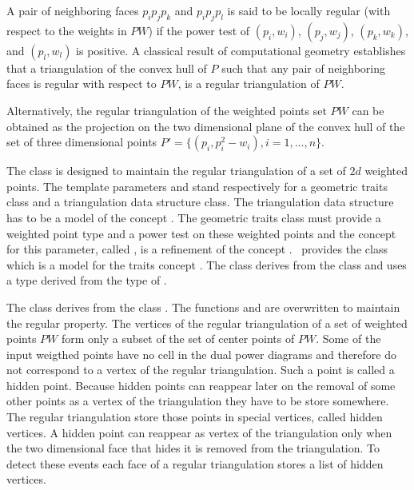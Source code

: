 A pair of neighboring faces $p_ip_jp_k$
and $p_ip_jp_l$ is said to be locally regular
(with respect to  the weights in ${  PW}$)
if the power test of $(p_i, w_i)$, $(p_j, w_j)$, $(p_k, w_k)$,
and $(p_l, w_l)$ is positive.
A classical  result of computational geometry
establishes that a triangulation of the convex hull of ${  P}$
such that any pair of neighboring faces is regular with respect
to ${  PW}$, is a
 regular triangulation of ${  PW}$.

Alternatively, the regular triangulation
of the weighted points set ${  PW}$
can be obtained as the projection
on the two dimensional plane of the convex hull of the set of three
dimensional points 
${  P'}= \{ (p_i,p_i ^2 - w_i ), i = 1, \ldots , n \}$.

The class 
 is designed to maintain the
regular triangulation of a set of $2d$ weighted points.
The template parameters   and  stand respectively
 for a geometric traits class and a triangulation data structure class.
The triangulation data structure has to be a model of the concept
.
The geometric traits class must provide a weighted point type
and a power test on these weighted points
and the concept for this parameter, called
,
is a refinement of the concept
. \cgal\ provides 
the class
which is a model for the traits concept
.
The class 
derives  from the class
and uses a  type
derived from the type  of
.


The class 
derives from the class .
The functions  and 
 are overwritten to maintain the regular
property.
The vertices of the regular triangulation
of a set of weighted points ${  PW}$ form only a subset
of the set of center points of ${   PW}$.
Some of the input
weigthed points have no cell in the dual power diagrams
and therefore do not correspond to a vertex of the regular
triangulation.
Such a point is called a hidden point.
Because hidden points can reappear later on the removal
of some other points  as a vertex of the triangulation
they  have to be store somewhere. 
The regular triangulation  store those points in special vertices, called
hidden vertices. 
A hidden point can reappear as vertex of the triangulation
only when the two dimensional face that hides it
is removed from the triangulation. To detect these events
each face of a regular triangulation stores a list of hidden vertices.


